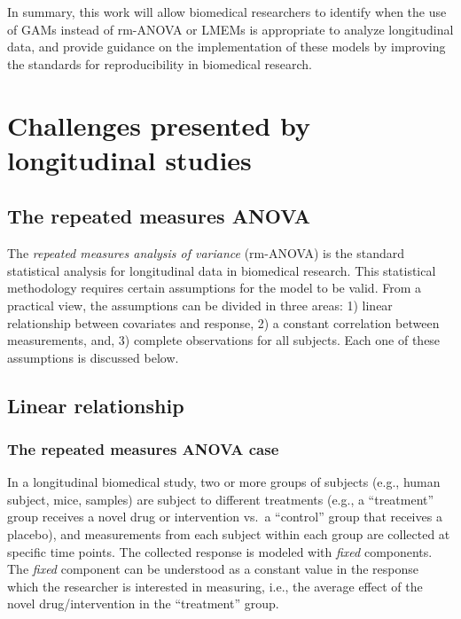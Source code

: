 \documentclass[
]{article}
\begin{document}
In summary, this work will allow biomedical researchers to identify when the use of GAMs instead of rm-ANOVA or LMEMs is appropriate to analyze longitudinal data, and provide guidance on the implementation of these models by improving the standards for reproducibility in biomedical research.

\FloatBarrier

\hypertarget{challenges-presented-by-longitudinal-studies}{%
\section{Challenges presented by longitudinal studies}\label{challenges-presented-by-longitudinal-studies}}

\hypertarget{the-repeated-measures-anova}{%
\subsection{The repeated measures ANOVA}\label{the-repeated-measures-anova}}

The \emph{repeated measures analysis of variance} (rm-ANOVA) is the standard statistical analysis for longitudinal data in biomedical research. This statistical methodology requires certain assumptions for the model to be valid. From a practical view, the assumptions can be divided in three areas: 1) linear relationship between covariates and response, 2) a constant correlation between measurements, and, 3) complete observations for all subjects. Each one of these assumptions is discussed below.

\hypertarget{linear-relationship}{%
\subsection{Linear relationship}\label{linear-relationship}}

\hypertarget{the-repeated-measures-anova-case}{%
\subsubsection{The repeated measures ANOVA case}\label{the-repeated-measures-anova-case}}

In a longitudinal biomedical study, two or more groups of subjects (e.g., human subject, mice, samples) are subject to different treatments (e.g., a ``treatment'' group receives a novel drug or intervention vs.~a ``control'' group that receives a placebo), and measurements from each subject within each group are collected at specific time points. The collected response is modeled with \emph{fixed} components. The \emph{fixed} component can be understood as a constant value in the response which the researcher is interested in measuring, i.e., the average effect of the novel drug/intervention in the ``treatment'' group.
\end{document}
